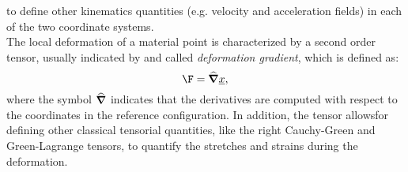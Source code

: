 to define other kinematics quantities (e.g. velocity and acceleration
fields) in each of the two coordinate systems.\\ The local deformation
of a material point is characterized by a second order tensor, usually
indicated by \F and called \textit{deformation gradient}, which is
defined as:
\begin{equation} \F = \delOp\nposE,
  \label{eq:tensorF}
\end{equation} where the symbol $\widehat{\boldsymbol{\nabla}}$ indicates that the
derivatives are computed with respect to the coordinates in the
reference configuration. In addition, the tensor \F allowsfor defining
other classical tensorial quantities, like the right Cauchy-Green and
Green-Lagrange tensors, to quantify the stretches and strains during
the deformation.\\

